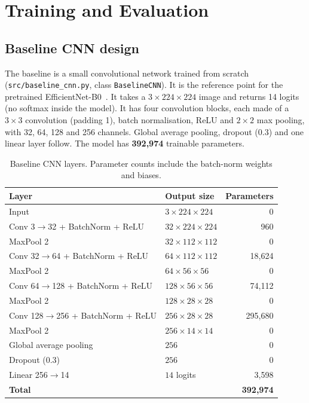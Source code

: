 \section{Training and Evaluation}

\subsection{Baseline CNN design}
The baseline is a small convolutional network trained from scratch
(\texttt{src/baseline\_cnn.py}, class \texttt{BaselineCNN}). It is the
reference point for the pretrained EfficientNet-B0~\cite{tan2019efficientnet}. It takes a
$3 \times 224 \times 224$ image and returns 14 logits (no softmax inside the
model). It has four convolution blocks, each made of a $3 \times 3$
convolution (padding 1), batch normalisation, ReLU and $2 \times 2$ max
pooling, with 32, 64, 128 and 256 channels. Global average pooling,
dropout ($0.3$) and one linear layer follow. The model has
\textbf{392,974} trainable parameters.

\begin{table}[H]
  \centering
  \begin{tabular}{|l|l|r|}
    \hline
    \textbf{Layer} & \textbf{Output size} & \textbf{Parameters} \\ \hline
    Input & $3 \times 224 \times 224$ & 0 \\ \hline
    Conv 3$\to$32 + BatchNorm + ReLU & $32 \times 224 \times 224$ & 960 \\ \hline
    MaxPool 2 & $32 \times 112 \times 112$ & 0 \\ \hline
    Conv 32$\to$64 + BatchNorm + ReLU & $64 \times 112 \times 112$ & 18,624 \\ \hline
    MaxPool 2 & $64 \times 56 \times 56$ & 0 \\ \hline
    Conv 64$\to$128 + BatchNorm + ReLU & $128 \times 56 \times 56$ & 74,112 \\ \hline
    MaxPool 2 & $128 \times 28 \times 28$ & 0 \\ \hline
    Conv 128$\to$256 + BatchNorm + ReLU & $256 \times 28 \times 28$ & 295,680 \\ \hline
    MaxPool 2 & $256 \times 14 \times 14$ & 0 \\ \hline
    Global average pooling & $256$ & 0 \\ \hline
    Dropout (0.3) & $256$ & 0 \\ \hline
    Linear 256$\to$14 & $14$ logits & 3,598 \\ \hline
    \textbf{Total} & & \textbf{392,974} \\ \hline
  \end{tabular}
  \caption{Baseline CNN layers. Parameter counts include the batch-norm
  weights and biases.}
\end{table}

